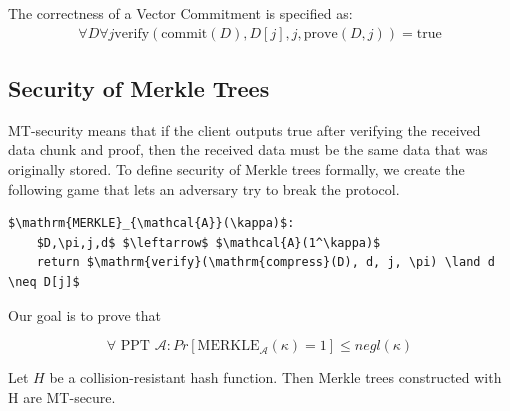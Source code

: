 The correctness of a Vector Commitment is specified as:
\begin{align}
  \forall D \forall j \mathrm{verify}(\mathrm{commit}(D), D[j], j, \mathrm{prove}(D, j)) = \mathrm{true}
\end{align}

\subsection{Security of Merkle Trees}

MT-security means that if the client outputs true after verifying the received data chunk and proof, then the received data must be the same data that was originally stored.
To define security of Merkle trees formally, we create the following game that lets an adversary try to break the protocol.

\begin{center}
    \begin{lstlisting}[mathescape=true]
$\mathrm{MERKLE}_{\mathcal{A}}(\kappa)$:
    $D,\pi,j,d$ $\leftarrow$ $\mathcal{A}(1^\kappa)$
    return $\mathrm{verify}(\mathrm{compress}(D), d, j, \pi) \land d \neq D[j]$
    \end{lstlisting}
\end{center}

Our goal is to prove that

$$
\forall \text{ PPT } \mathcal{A}: Pr[\mathrm{MERKLE}_{\mathcal{A}}(\kappa) = 1] \leq negl(\kappa)
$$
\begin{theorem}
Let $H$ be a collision-resistant hash function. Then Merkle trees constructed with H are MT-secure.
\end{theorem}

